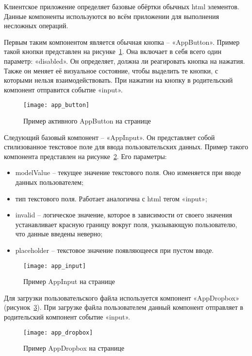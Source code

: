 Клиентское приложение определяет базовые обёртки обычных html элементов. Данные компоненты используются во всём приложении для выполнения несложных операций.

Первым таким компонентом является обычная кнопка – «AppButton». Пример такой кнопки представлен на рисунке~\ref{fig:app_button}. Она включает в себя всего один параметр: «disabled». Он определяет, должна ли реагировать кнопка на нажатия. Также он меняет её визуальное состояние, чтобы выделить те кнопки, с которыми нельзя взаимодействовать. При нажатии на кнопку в родительский компонент отправится событие «input».

\begin{figure}[h]
    \centering
    \texttt{[image: app\_button]}
    \caption{Пример активного AppButton на странице}\label{fig:app_button}
\end{figure}

Следующий базовый компонент – «AppInput». Он представляет собой стилизованное текстовое поле для ввода пользовательских данных. Пример такого компонента представлен на рисунке~\ref{fig:app_input}. Его параметры:

\begin{itemize}
    \item modelValue – текущее значение текстового поля. Оно изменяется при вводе данных пользователем;
    \item тип текстового поля. Работает аналогична с html тегом «input»;
    \item invalid – логическое значение, которое в зависимости от своего значения устанавливает красную границу вокруг поля, указывающую пользователю, что данные введены неверно;
    \item placeholder – текстовое значение появляющееся при пустом вводе.
\end{itemize}

\begin{figure}[h]
    \centering
    \texttt{[image: app\_input]}
    \caption{Пример AppInput на странице}\label{fig:app_input}
\end{figure}

Для загрузки пользовательского файла используется компонент «AppDropbox» (рисунок~\ref{fig:app_dropbox}). При загрузке файла пользователем данный компонент отправляет в родительский компонент событие «input».

\begin{figure}[h]
    \centering
    \texttt{[image: app\_dropbox]}
    \caption{Пример AppDropbox на странице}\label{fig:app_dropbox}
\end{figure}

